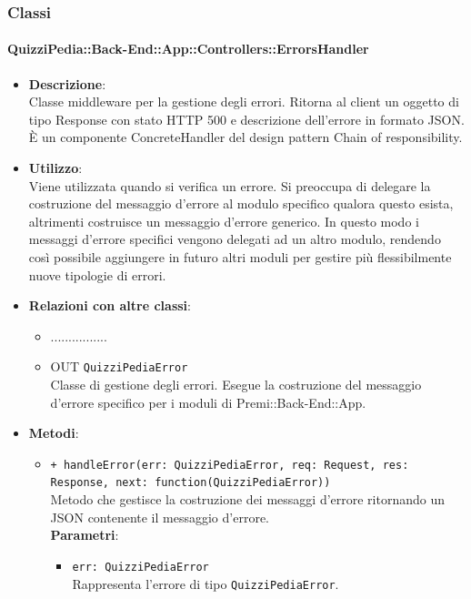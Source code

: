 \subsubsection{Classi}
\paragraph{QuizziPedia::Back-End::App::Controllers::ErrorsHandler}
\begin{itemize}
	\item \textbf{Descrizione}:\\
	Classe middleware per la gestione degli errori. Ritorna al client un oggetto di tipo Response con stato HTTP 500 e descrizione dell’errore in formato JSON. È un componente ConcreteHandler del design pattern Chain of responsibility.
	\item \textbf{Utilizzo}:\\
	Viene utilizzata quando si verifica un errore. Si preoccupa di delegare la costruzione del messaggio d’errore al modulo specifico qualora questo esista, altrimenti costruisce un messaggio d’errore generico. In questo modo i messaggi d’errore specifici vengono delegati ad un altro modulo, rendendo così possibile aggiungere in futuro altri moduli per gestire più flessibilmente nuove tipologie di errori.
	\item \textbf{Relazioni con altre classi}:\\
	\begin{itemize}
		\item ................
		\item OUT \texttt{QuizziPediaError}\\
		Classe di gestione degli errori. Esegue la costruzione del messaggio d’errore specifico per i moduli di Premi::Back-End::App.
	\end{itemize}
	\item \textbf{Metodi}:\\
	\begin{itemize}
		\item \texttt{+ handleError(err: QuizziPediaError, req: Request, res: Response, next: function(QuizziPediaError))}\\
		Metodo che gestisce la costruzione dei messaggi d’errore ritornando un JSON contenente il messaggio d’errore.\\
		\textbf{Parametri}:
		\begin{itemize}
			\item \texttt{err: QuizziPediaError}\\
			Rappresenta l'errore di tipo \texttt{QuizziPediaError}.

\end{itemize}
\end{itemize}
\end{itemize}
